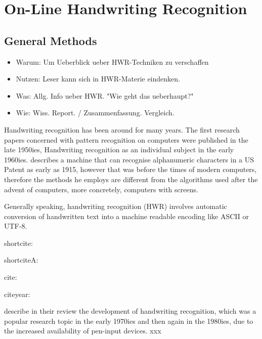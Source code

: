 
\chapter{On-Line Handwriting Recognition}
\label{chap:onlinehwr}
  
\section{General Methods}
\label{sec:generalmethods}

\begin{itemize}
\item Warum: Um Ueberblick ueber HWR-Techniken zu verschaffen
\item Nutzen: Leser kann sich in HWR-Materie eindenken.
\item Was: Allg. Info ueber HWR. "Wie geht das ueberhaupt?"
\item Wie: Wiss. Report. / Zusammenfassung. Vergleich.
\end{itemize}

Handwriting recognition has been around for many years. The first research
papers concerned with pattern recognition on computers were published in
the late 1950ies, Handwriting recognition as an individual subject in 
the early 1960ies.  describes a machine that can
recognise alphanumeric characters in a US Patent as early as 1915, 
however that was before the times of modern computers, 
therefore the methods he employs are different from the algorithms used
after the advent of computers, more concretely, computers with screens.

Generally speaking, handwriting recognition (HWR) involves automatic 
conversion of handwritten text into a machine readable encoding like ASCII or UTF-8.




shortcite:  

shortciteA:  



cite: \cite{Tappert1990} 

citeyear: \citeyear{Tappert1990}

describe in their review the development of handwriting recognition, which was a popular research topic in the early 1970ies and then again in the 1980ies, due to the increased availability of pen-input devices.
xxx



